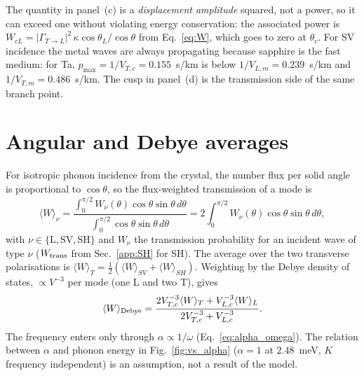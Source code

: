 \documentclass[11pt,a4paper]{article}
\begin{document}
The quantity in panel~(c) is a \emph{displacement amplitude} squared, not a power, so it can
exceed one without violating energy conservation: the associated power is
$W_{cL}=|\Gamma_{T\to L}|^2\,\kappa\cos\theta_L/\cos\theta$ from Eq.~\eqref{eq:W}, which goes
to zero at $\theta_c$. For SV incidence the metal waves are always propagating because
sapphire is the fast medium: for Ta, $p_{\max}=1/V_{T,c}=0.155$~s/km is below
$1/V_{L,m}=0.239$~s/km and $1/V_{T,m}=0.486$~s/km. The cusp in panel~(d) is the transmission
side of the same branch point.

\section{Angular and Debye averages}

For isotropic phonon incidence from the crystal, the number flux per solid angle is
proportional to $\cos\theta$, so the flux-weighted transmission of a mode is
\begin{equation}
  \langle W\rangle_\nu=\frac{\int_0^{\pi/2}W_\nu(\theta)\cos\theta\sin\theta\,d\theta}
                          {\int_0^{\pi/2}\cos\theta\sin\theta\,d\theta}
   =2\int_0^{\pi/2}W_\nu(\theta)\cos\theta\sin\theta\,d\theta ,
\end{equation}
with $\nu\in\{\mathrm{L,SV,SH}\}$ and $W_\nu$ the transmission probability for an incident wave
of type $\nu$ ($W_{\rm trans}$ from Sec.~\ref{app:SH} for SH). The average over the two
transverse polarisations is $\langle W\rangle_T=\tfrac12(\langle W\rangle_{SV}+\langle W\rangle_{SH})$.
Weighting by the Debye density of states, $\propto V^{-3}$ per mode (one L and two T), gives
\begin{equation}
  \langle W\rangle_{\rm Debye}
  =\frac{2V_{T,c}^{-3}\langle W\rangle_T+V_{L,c}^{-3}\langle W\rangle_L}{2V_{T,c}^{-3}+V_{L,c}^{-3}} .
\end{equation}
The frequency enters only through $\alpha\propto1/\omega$ (Eq.~\eqref{eq:alpha_omega}). The
relation between $\alpha$ and phonon energy in Fig.~\ref{fig:vs_alpha}
($\alpha=1$ at $2.48$~meV, $K$ frequency independent) is an assumption, not a result of the
model.
\end{document}
